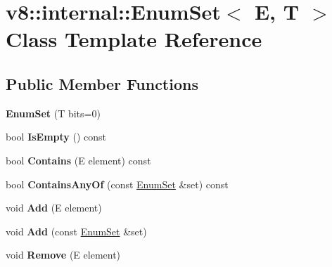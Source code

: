 \hypertarget{classv8_1_1internal_1_1_enum_set}{}\section{v8\+:\+:internal\+:\+:Enum\+Set$<$ E, T $>$ Class Template Reference}
\label{classv8_1_1internal_1_1_enum_set}
\subsection*{Public Member Functions}
\begin{DoxyCompactItemize}
\item 
{\bfseries Enum\+Set} (T bits=0)\hypertarget{classv8_1_1internal_1_1_enum_set_aa49d5338228eb356b622f7e0f2f0d154}{}\label{classv8_1_1internal_1_1_enum_set_aa49d5338228eb356b622f7e0f2f0d154}

\item 
bool {\bfseries Is\+Empty} () const \hypertarget{classv8_1_1internal_1_1_enum_set_ac2585f979c8889937f2a6ee0533379de}{}\label{classv8_1_1internal_1_1_enum_set_ac2585f979c8889937f2a6ee0533379de}

\item 
bool {\bfseries Contains} (E element) const \hypertarget{classv8_1_1internal_1_1_enum_set_a8699967dac5219fa0891c333a13bae93}{}\label{classv8_1_1internal_1_1_enum_set_a8699967dac5219fa0891c333a13bae93}

\item 
bool {\bfseries Contains\+Any\+Of} (const \hyperlink{classv8_1_1internal_1_1_enum_set}{Enum\+Set} \&set) const \hypertarget{classv8_1_1internal_1_1_enum_set_a78895bcbbca5f4713e3734619c7d9085}{}\label{classv8_1_1internal_1_1_enum_set_a78895bcbbca5f4713e3734619c7d9085}

\item 
void {\bfseries Add} (E element)\hypertarget{classv8_1_1internal_1_1_enum_set_af854cc88381481e5fe5e6550b12fe11d}{}\label{classv8_1_1internal_1_1_enum_set_af854cc88381481e5fe5e6550b12fe11d}

\item 
void {\bfseries Add} (const \hyperlink{classv8_1_1internal_1_1_enum_set}{Enum\+Set} \&set)\hypertarget{classv8_1_1internal_1_1_enum_set_a6b035c820d2141ea9da9696becdaaa20}{}\label{classv8_1_1internal_1_1_enum_set_a6b035c820d2141ea9da9696becdaaa20}

\item 
void {\bfseries Remove} (E element)\hypertarget{classv8_1_1internal_1_1_enum_set_a2ebc5126eedda032e601eea6d0024b18}{}\label{classv8_1_1internal_1_1_enum_set_a2ebc5126eedda032e601eea6d0024b18}


\end{DoxyCompactItemize}
